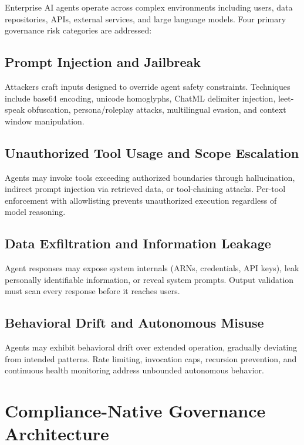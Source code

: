 \documentclass[conference]{IEEEtran}
\begin{document}
Enterprise AI agents operate across complex environments including users, data repositories, APIs, external services, and large language models. Four primary governance risk categories are addressed:

\subsection{Prompt Injection and Jailbreak}

Attackers craft inputs designed to override agent safety constraints. Techniques include base64 encoding, unicode homoglyphs, ChatML delimiter injection, leet-speak obfuscation, persona/roleplay attacks, multilingual evasion, and context window manipulation.

\subsection{Unauthorized Tool Usage and Scope Escalation}

Agents may invoke tools exceeding authorized boundaries through hallucination, indirect prompt injection via retrieved data, or tool-chaining attacks. Per-tool enforcement with allowlisting prevents unauthorized execution regardless of model reasoning.

\subsection{Data Exfiltration and Information Leakage}

Agent responses may expose system internals (ARNs, credentials, API keys), leak personally identifiable information, or reveal system prompts. Output validation must scan every response before it reaches users.

\subsection{Behavioral Drift and Autonomous Misuse}

Agents may exhibit behavioral drift over extended operation, gradually deviating from intended patterns. Rate limiting, invocation caps, recursion prevention, and continuous health monitoring address unbounded autonomous behavior.

\section{Compliance-Native Governance Architecture}
\end{document}
